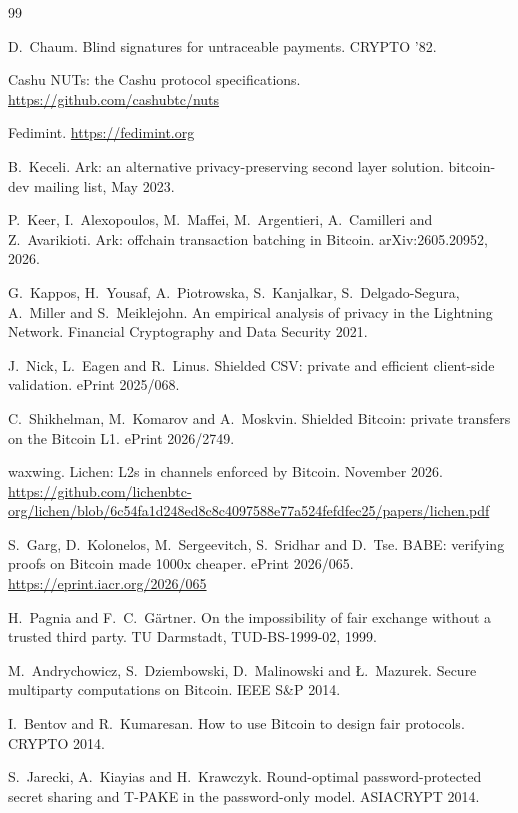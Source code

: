 \documentclass[11pt]{article}
\begin{document}
\begin{thebibliography}{99}
\small

 D.~Chaum. Blind signatures for untraceable payments. CRYPTO '82.

 Cashu NUTs: the Cashu protocol specifications. \url{https://github.com/cashubtc/nuts}

 Fedimint. \url{https://fedimint.org}

 B.~Keceli. Ark: an alternative privacy-preserving second layer solution. bitcoin-dev mailing list, May 2023.

 P.~Keer, I.~Alexopoulos, M.~Maffei, M.~Argentieri, A.~Camilleri and Z.~Avarikioti. Ark: offchain transaction batching in Bitcoin. arXiv:2605.20952, 2026.

 G.~Kappos, H.~Yousaf, A.~Piotrowska, S.~Kanjalkar, S.~Delgado-Segura, A.~Miller and S.~Meiklejohn. An empirical analysis of privacy in the Lightning Network. Financial Cryptography and Data Security 2021.

 J.~Nick, L.~Eagen and R.~Linus. Shielded CSV: private and efficient client-side validation. ePrint 2025/068.

 C.~Shikhelman, M.~Komarov and A.~Moskvin. Shielded Bitcoin: private transfers on the Bitcoin L1. ePrint 2026/2749.

 waxwing. Lichen: L2s in channels enforced by Bitcoin. November 2026. \url{https://github.com/lichenbtc-org/lichen/blob/6c54fa1d248ed8c8c4097588e77a524fefdfec25/papers/lichen.pdf}

 S.~Garg, D.~Kolonelos, M.~Sergeevitch, S.~Sridhar and D.~Tse. BABE: verifying proofs on Bitcoin made 1000x cheaper. ePrint 2026/065. \url{https://eprint.iacr.org/2026/065}

 H.~Pagnia and F.~C.~G\"artner. On the impossibility of fair exchange without a trusted third party. TU Darmstadt, TUD-BS-1999-02, 1999.

 M.~Andrychowicz, S.~Dziembowski, D.~Malinowski and {\L}.~Mazurek. Secure multiparty computations on Bitcoin. IEEE S\&P 2014.

 I.~Bentov and R.~Kumaresan. How to use Bitcoin to design fair protocols. CRYPTO 2014.

 S.~Jarecki, A.~Kiayias and H.~Krawczyk. Round-optimal password-protected secret sharing and T-PAKE in the password-only model. ASIACRYPT 2014.


\end{thebibliography}
\end{document}
